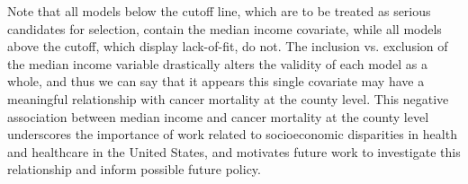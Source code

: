 		Note that all models below the cutoff line, which are to be treated as serious candidates for selection, contain the median income covariate, while all models
		above the cutoff, which display lack-of-fit, do not. The inclusion vs. exclusion of the median income variable drastically alters the validity of each model as a whole, and
		thus we can say that it appears this single covariate may have a meaningful relationship with cancer mortality at the county level. This negative association between
		median income and cancer mortality at the county level underscores the importance of work related to socioeconomic disparities in health and healthcare in the United States,
		and motivates future work to investigate this relationship and inform possible future policy.

